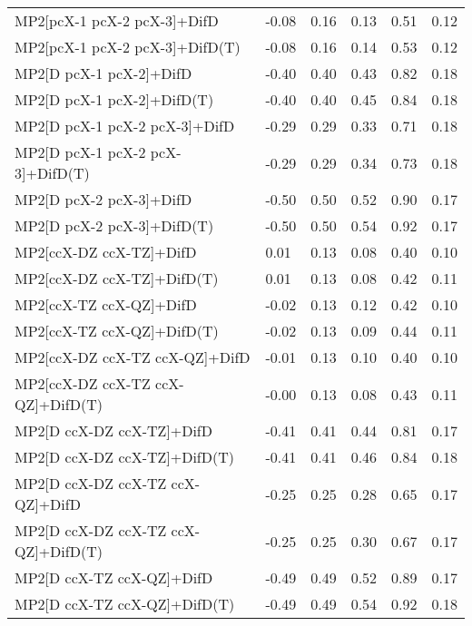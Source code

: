 \begin{table}
\begin{tabular}{l l l l l l }
    MP2[pcX-1 pcX-2 pcX-3]+DifD & -0.08 & 0.16 & 0.13 & 0.51 & 0.12 \\ 
    MP2[pcX-1 pcX-2 pcX-3]+DifD(T) & -0.08 & 0.16 & 0.14 & 0.53 & 0.12 \\ 
    MP2[D pcX-1 pcX-2]+DifD & -0.40 & 0.40 & 0.43 & 0.82 & 0.18 \\ 
    MP2[D pcX-1 pcX-2]+DifD(T) & -0.40 & 0.40 & 0.45 & 0.84 & 0.18 \\ 
    MP2[D pcX-1 pcX-2 pcX-3]+DifD & -0.29 & 0.29 & 0.33 & 0.71 & 0.18 \\ 
    MP2[D pcX-1 pcX-2 pcX-3]+DifD(T) & -0.29 & 0.29 & 0.34 & 0.73 & 0.18 \\ 
    MP2[D pcX-2 pcX-3]+DifD & -0.50 & 0.50 & 0.52 & 0.90 & 0.17 \\ 
    MP2[D pcX-2 pcX-3]+DifD(T) & -0.50 & 0.50 & 0.54 & 0.92 & 0.17 \\ 
    MP2[ccX-DZ ccX-TZ]+DifD & 0.01 & 0.13 & 0.08 & 0.40 & 0.10 \\ 
    MP2[ccX-DZ ccX-TZ]+DifD(T) & 0.01 & 0.13 & 0.08 & 0.42 & 0.11 \\ 
    MP2[ccX-TZ ccX-QZ]+DifD & -0.02 & 0.13 & 0.12 & 0.42 & 0.10 \\ 
    MP2[ccX-TZ ccX-QZ]+DifD(T) & -0.02 & 0.13 & 0.09 & 0.44 & 0.11 \\ 
    MP2[ccX-DZ ccX-TZ ccX-QZ]+DifD & -0.01 & 0.13 & 0.10 & 0.40 & 0.10 \\ 
    MP2[ccX-DZ ccX-TZ ccX-QZ]+DifD(T) & -0.00 & 0.13 & 0.08 & 0.43 & 0.11 \\ 
    MP2[D ccX-DZ ccX-TZ]+DifD & -0.41 & 0.41 & 0.44 & 0.81 & 0.17 \\ 
    MP2[D ccX-DZ ccX-TZ]+DifD(T) & -0.41 & 0.41 & 0.46 & 0.84 & 0.18 \\ 
    MP2[D ccX-DZ ccX-TZ ccX-QZ]+DifD & -0.25 & 0.25 & 0.28 & 0.65 & 0.17 \\ 
    MP2[D ccX-DZ ccX-TZ ccX-QZ]+DifD(T) & -0.25 & 0.25 & 0.30 & 0.67 & 0.17 \\ 
    MP2[D ccX-TZ ccX-QZ]+DifD & -0.49 & 0.49 & 0.52 & 0.89 & 0.17 \\ 
    MP2[D ccX-TZ ccX-QZ]+DifD(T) & -0.49 & 0.49 & 0.54 & 0.92 & 0.18 \\ 
    \bottomrule
  \end{tabular}
\end{table}
